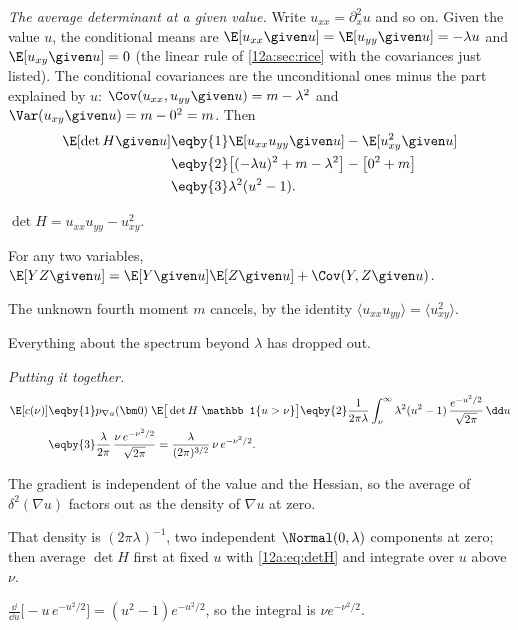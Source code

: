 \emph{The average determinant at a given value.} Write $u_{xx}=\partial_x^2u$ and so on. Given the value $u$,
the conditional means are $\E[u_{xx}\given u]=\E[u_{yy}\given u]=-\lambda u$ and $\E[u_{xy}\given u]=0$
(the linear rule of \cref{12a:sec:rice} with the covariances just listed). The conditional covariances are the
unconditional ones minus the part explained by $u$: $\Cov(u_{xx},u_{yy}\given u)=m-\lambda^2$ and
$\Var(u_{xy}\given u)=m-0^2=m$. Then
\begin{align}
  \E[\det H\given u]
  &\eqby{1}\E[u_{xx}u_{yy}\given u]-\E[u_{xy}^2\given u]\nonumber\\
  &\eqby{2}\big[(-\lambda u)^2+m-\lambda^2\big]-\big[0^2+m\big]\nonumber\\
  &\eqby{3}\lambda^2(u^2-1).
  \label{12a:eq:detH}
\end{align}
\begin{explain}
  \item $\det H=u_{xx}u_{yy}-u_{xy}^2$.
  \item For any two variables, $\E[YZ\given u]=\E[Y\given u]\E[Z\given u]+\Cov(Y,Z\given u)$.
  \item The unknown fourth moment $m$ cancels, by the identity
        $\langle u_{xx}u_{yy}\rangle=\langle u_{xy}^2\rangle$.
\end{explain}
Everything about the spectrum beyond $\lambda$ has dropped out.

\emph{Putting it together.}
\begin{align}
  \E[c(\nu)]
  &\eqby{1}p_{\nabla u}(\bm 0)\;\E\big[\det H\;\mathbb 1\{u>\nu\}\big]
   \eqby{2}\frac{1}{2\pi\lambda}\int_\nu^\infty\lambda^2(u^2-1)\,\frac{e^{-u^2/2}}{\sqrt{2\pi}}\,\dd u\nonumber\\
  &\eqby{3}\frac{\lambda}{2\pi}\,\frac{\nu\,e^{-\nu^2/2}}{\sqrt{2\pi}}
   =\frac{\lambda}{(2\pi)^{3/2}}\,\nu\,e^{-\nu^2/2}.
  \label{12a:eq:gkf2}
\end{align}
\begin{explain}
  \item The gradient is independent of the value and the Hessian, so the average of $\delta^2(\nabla u)$
        factors out as the density of $\nabla u$ at zero.
  \item That density is $(2\pi\lambda)^{-1}$, two independent $\Normal(0,\lambda)$ components at zero; then
        average $\det H$ first at fixed $u$ with \eqref{12a:eq:detH} and integrate over $u$ above $\nu$.
  \item $\frac{\dd}{\dd u}\big[-u\,e^{-u^2/2}\big]=(u^2-1)e^{-u^2/2}$, so the integral is $\nu e^{-\nu^2/2}$.
\end{explain}

